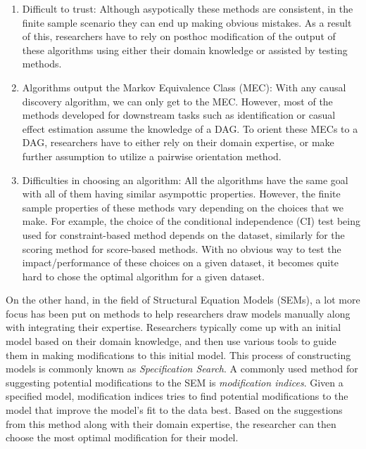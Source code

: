 \documentclass[letterpaper]{article} %
\begin{document}
\begin{enumerate}
	\item Difficult to trust: Although asypotically these methods are 
		consistent, in the finite sample scenario they can end up
		making obvious mistakes. As a result of this, researchers
		have to rely on posthoc modification of the output of these
		algorithms using either their domain knowledge or assisted
		by testing methods.
	\item Algorithms output the Markov Equivalence Class (MEC): With any
		causal discovery algorithm, we can only get to the MEC. However,
		most of the methods developed for downstream tasks such 
		as identification or casual effect estimation assume the
		knowledge of a DAG. To orient these MECs to a DAG, researchers
		have to either rely on their domain expertise, or make further
		assumption to utilize a pairwise orientation method.
	\item Difficulties in choosing an algorithm: All the algorithms
		have the same goal with all of them having similar asympottic
		properties. However, the finite sample properties of these
		methods vary depending on the choices that we make. For
		example, the choice of the conditional independence (CI) test
		being used for constraint-based method depends on the dataset,
		similarly for the scoring method for score-based methods. With
		no obvious way to test the impact/performance of these choices
		on a given dataset, it becomes quite hard to chose the optimal
		algorithm for a given dataset.
\end{enumerate}

On the other hand, in the field of Structural Equation Models (SEMs), a lot
more focus has been put on methods to help researchers draw models manually
along with integrating their expertise. Researchers typically come up with an
initial model based on their domain knowledge, and then use various tools to
guide them in making modifications to this initial model. This process of
constructing models is commonly known as \emph{Specification Search}. A
commonly used method for suggesting potential modifications to the SEM is
\emph{modification indices}. Given a specified model, modification indices
tries to find potential modifications to the model that improve the model's fit
to the data best. Based on the suggestions from this method along with their
domain expertise, the researcher can then choose the most optimal modification
for their model.

\end{document}
